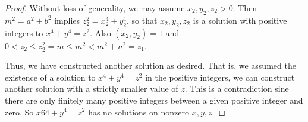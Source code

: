 \documentclass{ximera}
\begin{document}
\begin{proof}
Without loss of generality, we may assume $x_2,y_2,z_2>0$. Then $m^2=a^2+b^2$ implies $z_2^2=x_2^4+y_2^4$, so that $x_2,y_2,z_2$ is a solution with positive integers to $x^4+y^4=z^2$. Also $(x_2,y_2)=1$ and $0<z_2\leq z_2^2 =m\leq m^2<m^2+n^2=z_1$.

Thus, we have constructed another solution as desired. That is, we assumed the existence of a solution to $x^4+y^4=z^2$ in the positive integers, we can construct another solution with a strictly smaller value of $z$. This is a contradiction sine there are only finitely many positive integers between a given positive integer and zero. So $x64+y^4=z^2$ has no solutions on nonzero $x,y,z$.
\end{proof}
\end{document}
